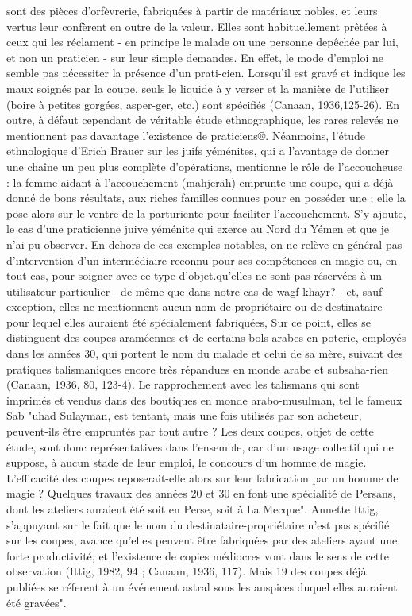 sont des pièces d'orfèvrerie, fabriquées à partir de matériaux nobles, et leurs vertus leur confèrent en outre de la valeur. Elles sont habituellement prêtées à ceux qui les réclament - en principe le malade ou une personne depêchée par lui, et non un praticien - sur leur simple demandes. En effet, le mode d'emploi ne semble pas nécessiter la présence d'un prati-cien. Lorsqu'il est gravé et indique les maux soignés par la coupe, seuls le liquide à y verser et la manière de l'utiliser (boire à petites gorgées, asper-ger, etc.) sont spécifiés (Canaan, 1936,125-26). En outre, à défaut cependant de véritable étude ethnographique, les rares relevés ne mentionnent pas davantage l'existence de praticiens®. Néanmoins, l'étude ethnologique d'Erich Brauer sur les juifs yéménites, qui a l'avantage de donner une chaîne un peu plus complète d'opérations, mentionne le rôle de l'accoucheuse : la femme aidant à l'accouchement (mahjeräh) emprunte une coupe, qui a déjà donné de bons résultats, aux riches familles connues pour en posséder une ; elle la pose alors sur le ventre de la parturiente pour faciliter l'accouchement. S'y ajoute, le cas d'une praticienne juive yéménite qui exerce au Nord du Yémen et que je n'ai pu observer.
En dehors de ces exemples notables, on ne relève en général pas d'intervention d'un intermédiaire reconnu pour ses compétences en magie ou, en tout cas, pour soigner avec ce type d'objet.qu'elles ne sont pas réservées à un utilisateur particulier - de même que dans notre cas de wagf khayr? - et, sauf exception, elles ne mentionnent aucun nom de propriétaire ou de destinataire pour lequel elles auraient été spécialement fabriquées, Sur ce point, elles se distinguent des coupes araméennes et de certains bols arabes en poterie, employés dans les années 30, qui portent le nom du malade et celui de sa mère, suivant des pratiques talismaniques encore très répandues en monde arabe et subsaha-rien (Canaan, 1936, 80, 123-4). Le rapprochement avec les talismans qui sont imprimés et vendus dans des boutiques en monde arabo-musulman, tel le fameux Sab "uhād Sulayman, est tentant, mais une fois utilisés par son acheteur, peuvent-ils être empruntés par tout autre ? Les deux coupes, objet de cette étude, sont donc représentatives dans l'ensemble, car d'un usage collectif qui ne suppose, à aucun stade de leur emploi, le concours d'un homme de magie.
L'efficacité des coupes reposerait-elle alors sur leur fabrication par un homme de magie ? Quelques travaux des années 20 et 30 en font une spécialité de Persans, dont les ateliers auraient été soit en Perse, soit à La Mecque". Annette Ittig, s'appuyant sur le fait que le nom du destinataire-propriétaire n'est pas spécifié sur les coupes, avance qu'elles peuvent être fabriquées par des ateliers ayant une forte productivité, et l'existence de copies médiocres vont dans le sens de cette observation (Ittig, 1982, 94 ;
Canaan, 1936, 117). Mais 19 des coupes déjà publiées se réferent à un événement astral sous les auspices duquel elles auraient été gravées".

